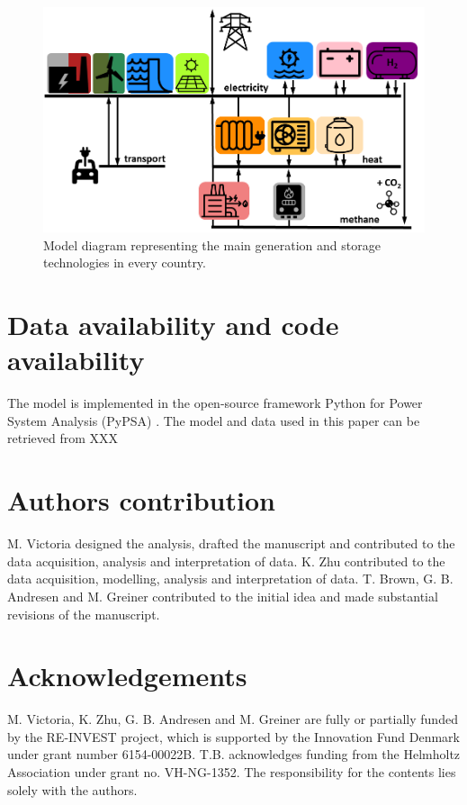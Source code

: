 \documentclass[5p]{elsarticle} %
\begin{document}
\begin{figure}[!h]
\centering
\includegraphics[width=\columnwidth]{../figures/model.png}
\caption{Model diagram representing the main generation and storage technologies in every country.} \label{fig_model} 
\end{figure}

\section{Data availability and code availability}

The model is implemented in the open-source framework Python for Power System Analysis (PyPSA) \cite{PyPSA}. The model and data used in this paper can be retrieved from \textcolor[rgb]{1,0,0}{XXX}

\section{Authors contribution}

M. Victoria designed the analysis, drafted the manuscript and contributed to the data acquisition, analysis and interpretation of data. K. Zhu contributed to the data acquisition, modelling, analysis and interpretation of data. 
T. Brown, G. B. Andresen and M. Greiner contributed to the initial idea and made substantial revisions of the manuscript. 

\section{Acknowledgements}
M. Victoria, K. Zhu, G. B. Andresen and M. Greiner are fully or partially funded by the RE-INVEST project, which is supported by  the  Innovation  Fund  Denmark  under  grant  number  6154-00022B. T.B. acknowledges funding from the Helmholtz Association under grant no. VH-NG-1352. The responsibility for the contents lies solely with the authors.


\end{document}
